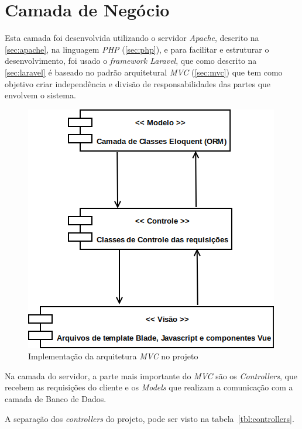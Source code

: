 \section{Camada de Negócio}

Esta camada foi desenvolvida utilizando o servidor \textit{Apache}, descrito na \autoref{sec:apache}, na linguagem \textit{PHP} (\autoref{sec:php}), e para facilitar e estruturar o desenvolvimento, foi usado o \textit{framework Laravel}, que como descrito na \autoref{sec:laravel} é baseado no padrão arquitetural \textit{MVC} (\autoref{sec:mvc}) que tem como objetivo criar independência e divisão de responsabilidades das partes que envolvem o sistema.

\begin{figure}[h]
    \centering
    \includegraphics[keepaspectratio=true,scale=0.45]{figuras/diagrama_mvc.png}
    \caption{Implementação da arquitetura \textit{MVC} no projeto}
    \label{fig:diagrama-mvc}
\end{figure}

Na camada do servidor, a parte mais importante do \textit{MVC} são os \textit{Controllers}, que recebem as requisições do cliente e os \textit{Models} que realizam a comunicação com a camada de Banco de Dados.

A separação dos \textit{controllers} do projeto, pode ser visto na tabela~\ref{tbl:controllers}.

